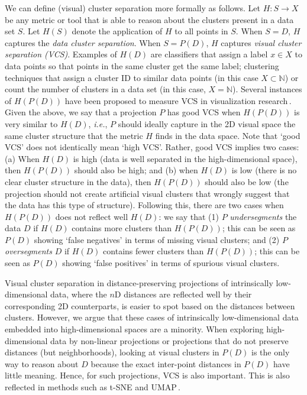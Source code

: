 \documentclass[sagev,Afour,times]{sagej}
\begin{document}
We can define (visual) cluster separation more formally as follows. Let $H : S \rightarrow X$ be any metric or tool that is able to reason about the clusters present in a data set $S$. Let $H(S)$ denote the application of $H$ to all points in $S$. When $S = D$, $H$ captures the \emph{data cluster separation}. When $S = P(D)$, $H$ captures \emph{visual cluster separation (VCS)}. Examples of $H(D)$ are classifiers that assign a label $x \in X$ to data points so that points in the same cluster get the same label; clustering techniques that assign a cluster ID to similar data points (in this case $X \subset \mathbb{N}$) or count the number of clusters in a data set (in this case, $X = \mathbb{N}$). Several instances of $H(P(D))$ have been proposed to measure VCS in visualization research\,\cite{mateusDR_survey2019}. Given the above, we say that a projection $P$ has good VCS when $H(P(D))$ is very similar to $H(D)$, \emph{i.e.}, $P$ should ideally capture in the 2D visual space the same cluster structure that the metric $H$ finds in the data space. Note that `good VCS' does not identically mean `high VCS'. Rather, good VCS implies two cases: (a) When $H(D)$ is high (data is well separated in the high-dimensional space), then $H(P(D))$ should also be high; and (b) when $H(D)$ is low (there is no clear cluster structure in the data), then $H(P(D))$ should also be low (the projection should not create artificial visual clusters that wrongly suggest that the data has this type of structure). Following this, there are two cases when $H(P(D))$ does not reflect well $H(D)$: we say that (1) $P$ \emph{undersegments} the data $D$ if $H(D)$ contains more clusters than $H(P(D))$; this can be seen as $P(D)$ showing `false negatives' in terms of missing visual clusters; and (2) $P$ \emph{oversegments} $D$ if $H(D)$ contains fewer clusters than $H(P(D))$; this can be seen as $P(D)$ showing `false positives' in terms of spurious visual clusters.

Visual cluster separation in distance-preserving projections of intrinsically low-dimensional data, where the $n$D distances are reflected well by their corresponding 2D counterparts, is easier to spot based on the distances between clusters.
However, we argue that these cases of intrinsically low-dimensional data embedded into high-dimensional spaces are a minority. When exploring high-dimensional data by non-linear projections or projections that do not preserve distances (but neighborhoods), looking at visual clusters in $P(D)$ is the only way to reason about $D$ because the exact inter-point distances in $P(D)$ have little meaning. Hence, for such projections, VCS is also important. This is also reflected in methods such as t-SNE and UMAP\,\cite{tsne:original,umap2018}.
\end{document}
